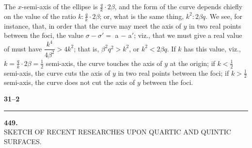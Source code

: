 \documentclass[11pt]{article}
\begin{document}
The $x$-semi-axis of the ellipse is $\tfrac{q}{k}\cdot 2\beta$, and the form of the curve depends chiefly
on the value of the ratio $k:\tfrac{q}{k}\cdot 2\beta$; or, what is the same thing, $k^2 : 2\beta q$. We see, for
instance, that, in order that the curve may meet the axis of $y$ in two real points
between the foci, the value $\sigma - \sigma' = $ a $-$ a$'$; viz., that we must give a real value of
must have $\dfrac{k^4}{4\beta^2} > 4k^2$; that is, $\beta^2 q^2 > k^2$, or $k^2 < 2\beta q$. If $k$ has this value, viz., $k = \tfrac{q}{k}\cdot 2\beta = \tfrac{1}{2}$
semi-axis, the curve touches the axis of $y$ at the origin; if $k < \tfrac{1}{2}$ semi-axis, the curve
cuts the axis of $y$ in two real points between the foci; if $k > \tfrac{1}{2}$ semi-axis, the curve
does not cut the axis of $y$ between the foci.

\medskip
\noindent\textbf{\hfill 31--2}

\bigskip
\hrule
\bigskip

\begin{center}
{\large\bfseries 449.}\\[6pt]
{\large SKETCH OF RECENT RESEARCHES UPON QUARTIC AND QUINTIC SURFACES.}
\end{center}

\medskip


\medskip
\end{document}
